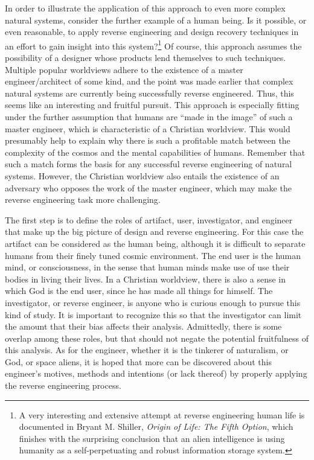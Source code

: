 In order to illustrate the application of this approach to even more
complex natural systems, consider the further example of a human being.
Is it possible, or even reasonable, to apply reverse engineering and
design recovery techniques in an effort to gain insight into this
system?\footnote{
A very interesting and extensive attempt at reverse
engineering human life is documented in Bryant M. Shiller,
\textit{Origin of Life: The Fifth Option},\citep{shiller2004}
which finishes with the surprising conclusion that an alien
intelligence is using humanity as a self-perpetuating and robust
information storage system.
} Of course, this approach assumes the
possibility of a designer whose products lend themselves to such
techniques. Multiple popular worldviews adhere to the existence of a
master engineer/architect of some kind, and the point was made earlier
that complex natural systems are currently being successfully reverse
engineered. Thus, this seems like an interesting and fruitful pursuit.
This approach is especially fitting under the further assumption that
humans are “made in the image” of such a master engineer, which is
characteristic of a Christian worldview. This would presumably help to
explain why there is such a profitable match between the complexity of
the cosmos and the mental capabilities of humans. Remember that such a
match forms the basis for any successful reverse engineering of natural
systems. However, the Christian worldview also entails the existence of
an adversary who opposes the work of the master engineer, which may
make the reverse engineering task more challenging.

The first step is to define the roles of artifact, user, investigator,
and engineer that make up the big picture of design and reverse
engineering. For this case the artifact can be considered as the human
being, although it is difficult to separate humans from their finely
tuned cosmic environment. The end user is the human mind, or
consciousness, in the sense that human minds make use of use their
bodies in living their lives. In a Christian worldview, there is also a
sense in which God is the end user, since he has made all things for
himself. The investigator, or reverse engineer, is anyone who is
curious enough to pursue this kind of study. It is important to
recognize this so that the investigator can limit the amount that their
bias affects their analysis. Admittedly, there is some overlap among
these roles, but that should not negate the potential fruitfulness of
this analysis. As for the engineer, whether it is the tinkerer of
naturalism, or God, or space aliens, it is hoped that more can be
discovered about this engineer’s motives, methods and intentions (or
lack thereof) by properly applying the reverse engineering process. 

